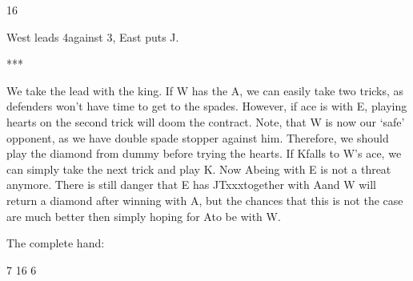 \documentclass[12pt, a4paper]{article}
\begin{document}
        {}{}
        {}{16}
        {}{}
        {}

West leads 4\spades against 3\nt, East puts J\spades.
\begin{center}
    ***
\end{center}
We take the lead with the king. 
If W has the A\hearts, we can easily take two \hearts
tricks, as defenders won't have time to get to the spades.
However, if ace is with E, playing hearts on the second trick
will doom the contract. Note, that W is now our `safe' opponent,
as we have double spade stopper against him.
Therefore, we should play the diamond from dummy before 
trying the hearts. If K\diams falls to W's ace, we
can simply take the next trick and play K\hearts.
Now A\hearts being with E is not a threat anymore.
There is still danger that E has JTxxx\diams together with A\hearts and W will
return a diamond after winning with A\diams, 
but the chances that this is not the case are much better
then simply hoping for A\hearts to be with W.

\vspace{0.2cm}

The complete hand:

        {}{7}
        {}{16}
        {}{6}
        {}
\end{document}
